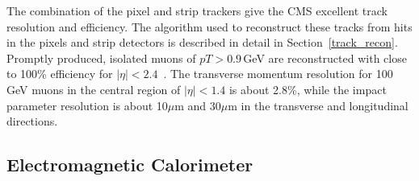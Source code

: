 The combination of the pixel and strip trackers give the CMS excellent track resolution and efficiency. The algorithm used to reconstruct these tracks from hits in the pixels and strip detectors is described in detail in Section~\ref{track_recon}.  Promptly  produced,  isolated  muons  of $pT>0.9$\,GeV are reconstructed with close to 100\% efficiency for $|\eta|<2.4$~\cite{track_reconstruction}. The transverse momentum resolution for 100\,GeV muons in the central region of $|\eta|<1.4$ is about 2.8\%, while the impact parameter resolution is about 10$\mu$m and 30$\mu$m in the transverse and longitudinal directions.


\subsection{Electromagnetic Calorimeter}
\label{Ecal}
